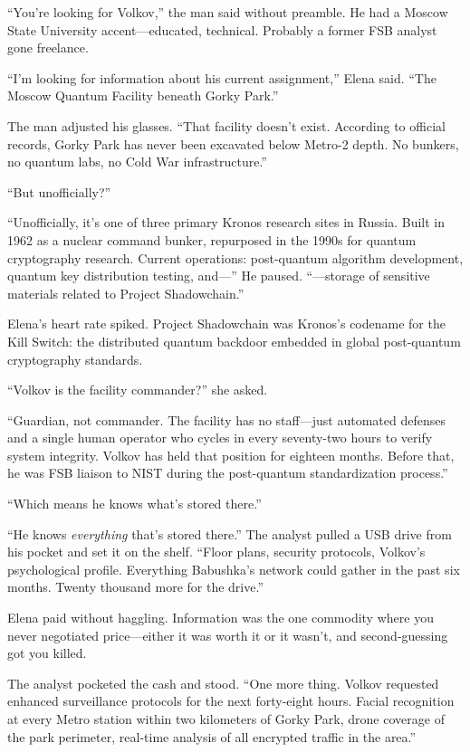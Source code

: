 ``You're looking for Volkov,'' the man said without preamble. He had a Moscow State University accent---educated, technical. Probably a former FSB analyst gone freelance.

``I'm looking for information about his current assignment,'' Elena said. ``The Moscow Quantum Facility beneath Gorky Park.''

The man adjusted his glasses. ``That facility doesn't exist. According to official records, Gorky Park has never been excavated below Metro-2 depth. No bunkers, no quantum labs, no Cold War infrastructure.''

``But unofficially?''

``Unofficially, it's one of three primary Kronos research sites in Russia. Built in 1962 as a nuclear command bunker, repurposed in the 1990s for quantum cryptography research. Current operations: post-quantum algorithm development, quantum key distribution testing, and---'' He paused. ``---storage of sensitive materials related to Project Shadowchain.''

Elena's heart rate spiked. Project Shadowchain was Kronos's codename for the Kill Switch: the distributed quantum backdoor embedded in global post-quantum cryptography standards.

``Volkov is the facility commander?'' she asked.

``Guardian, not commander. The facility has no staff---just automated defenses and a single human operator who cycles in every seventy-two hours to verify system integrity. Volkov has held that position for eighteen months. Before that, he was FSB liaison to NIST during the post-quantum standardization process.''

``Which means he knows what's stored there.''

``He knows \emph{everything} that's stored there.'' The analyst pulled a USB drive from his pocket and set it on the shelf. ``Floor plans, security protocols, Volkov's psychological profile. Everything Babushka's network could gather in the past six months. Twenty thousand more for the drive.''

Elena paid without haggling. Information was the one commodity where you never negotiated price---either it was worth it or it wasn't, and second-guessing got you killed.

The analyst pocketed the cash and stood. ``One more thing. Volkov requested enhanced surveillance protocols for the next forty-eight hours. Facial recognition at every Metro station within two kilometers of Gorky Park, drone coverage of the park perimeter, real-time analysis of all encrypted traffic in the area.''

